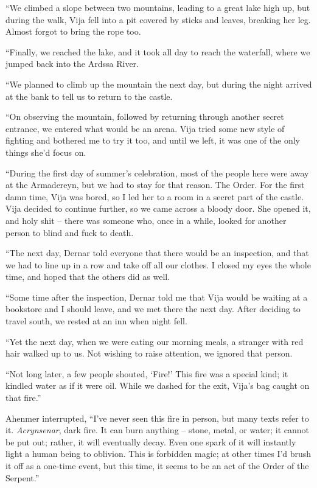 ``We climbed a slope between two mountains, leading to a great lake high up, but during the walk, Vija fell into a pit covered by sticks and leaves, breaking her leg. Almost forgot to bring the rope too.

``Finally, we reached the lake, and it took all day to reach the waterfall, where we jumped back into the Ardssa River.

``We planned to climb up the mountain the next day, but during the night \yronsyncra{} arrived at the bank to tell us to return to the castle.

``On observing the mountain, followed by returning through another secret entrance, we entered what would be an arena. Vija tried some new style of fighting and bothered me to try it too, and until we left, it was one of the only things she'd focus on.

``During the first day of summer's celebration, most of the people here were away at the Armadereyn, but we had to stay for that reason. The Order. For the first damn time, Vija was bored, so I led her to a room in a secret part of the castle. Vija decided to continue further, so we came across a bloody door. She opened it, and holy shit -- there was someone who, once in a while, looked for another person to blind and fuck to death.

``The next day, Dernar told everyone that there would be an inspection, and that we had to line up in a row and take off all our clothes. I closed my eyes the whole time, and hoped that the others did as well.

``Some time after the inspection, Dernar told me that Vija would be waiting at a bookstore and I should leave, and we met there the next day. After deciding to travel south, we rested at an inn when night fell.

``Yet the next day, when we were eating our morning meals, a stranger with red hair walked up to us. Not wishing to raise attention, we ignored that person.

``Not long later, a few people shouted, `Fire!' This fire was a special kind; it kindled water as if it were oil. While we dashed for the exit, Vija's bag caught on that fire.''

Ahenmer interrupted, ``I've never seen this fire in person, but many texts refer to it. \emph{Acrynsenar}, dark fire. It can burn anything -- stone, metal, or water; it cannot be put out; rather, it will eventually decay. Even one spark of it will instantly light a human being to oblivion. This is forbidden magic; at other times I'd brush it off as a one-time event, but this time, it seems to be an act of the Order of the Serpent.''

